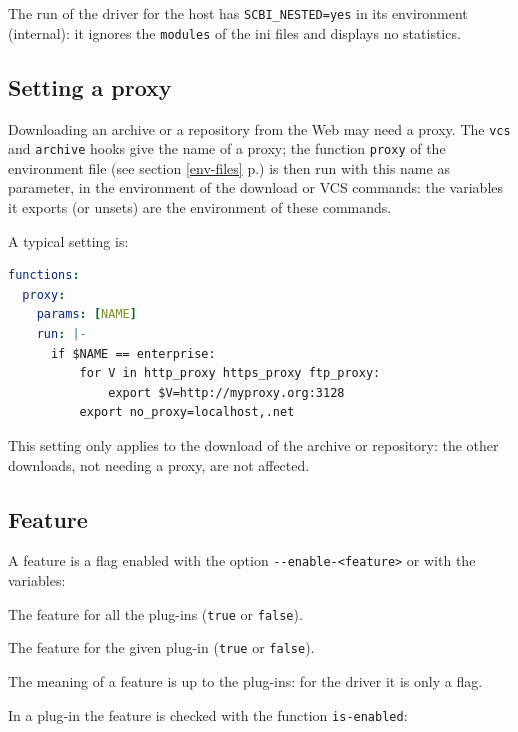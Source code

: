 \documentclass[a4paper,12pt,twoside]{article}
\newcommand{\code}[1]{\texttt{#1}}
\newcommand{\seeref}[1]{see section \ref{#1} p.\pageref{#1}}
\newcommand{\ddash}{-{}-}
\begin{document}
The run of the driver for the host has \code{SCBI\_NESTED=yes} in its
environment (internal): it ignores the \code{modules} of the ini files and
displays no statistics.

\subsection{Setting a proxy}
\label{proxy}

Downloading an archive or a repository from the Web may need a proxy. The \code{vcs} and \code{archive} hooks give the name of a proxy; the function \code{proxy} of the environment file (\seeref{env-files}) is then run with this name as parameter, in the environment of the download or VCS commands: the variables it exports (or unsets) are the environment of these commands.

A typical setting is:

\begin{lstlisting}[language={yaml}]
functions:
  proxy:
    params: [NAME]
    run: |-
      if $NAME == enterprise:
          for V in http_proxy https_proxy ftp_proxy:
              export $V=http://myproxy.org:3128
          export no_proxy=localhost,.net
\end{lstlisting}

This setting only applies to the download of the archive or repository: the other downloads, not needing a proxy, are not affected.

\subsection{Feature}
\label{enable-feature}

A feature is a flag enabled with the option \code{\ddash{}enable-<feature>} or with the variables:

\begin{description}[style=nextline]
	\item [SCBI\_<feature>\_FEATURE] The feature for all the plug-ins (\code{true} or \code{false}).
	\item [SCBI\_<plugin>\_<feature>\_FEATURE] The feature for the given plug-in (\code{true} or \code{false}).
\end{description}

The meaning of a feature is up to the plug-ins: for the driver it is only a flag.

In a plug-in the feature is checked with the function \code{is-enabled}:
\end{document}
